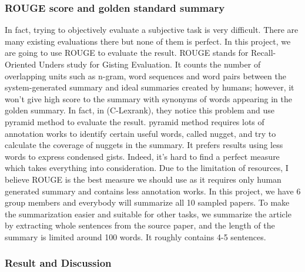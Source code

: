 \documentclass[hyp]{socreport}
\begin{document}
\subsubsection{ROUGE score and golden standard summary}

In fact, trying to objectively evaluate a subjective task is very difficult. There are many existing evaluations there but none of them is perfect. In this project, we are going to use ROUGE to evaluate the result. ROUGE stands for Recall-Oriented Unders study for Gisting Evaluation. It counts the number of overlapping units such as n-gram, word sequences and word pairs between the system-generated summary and ideal summaries created by humans; however, it won't give high score to the summary with synonyms of words appearing in the golden summary. In fact, in (C-Lexrank), they notice this problem and use pyramid method to evaluate the result. pyramid method requires lots of annotation works to identify certain useful words, called nugget, and try to calculate the coverage of nuggets in the summary. It prefers results using less words to express condensed gists. Indeed, it's hard to find a perfect measure which takes everything into consideration. Due to the limitation of resources, I believe ROUGE is the best measure we should use as it requires only human generated summary and contains less annotation works. In this project, we have 6 group members and everybody will summarize all 10 sampled papers. To make the summarization easier and suitable for other tasks, we summarize the article by extracting whole sentences from the source paper, and the length of the summary is limited around 100 words. It roughly contains 4-5 sentences.

\subsubsection{Result and Discussion}
\end{document}
